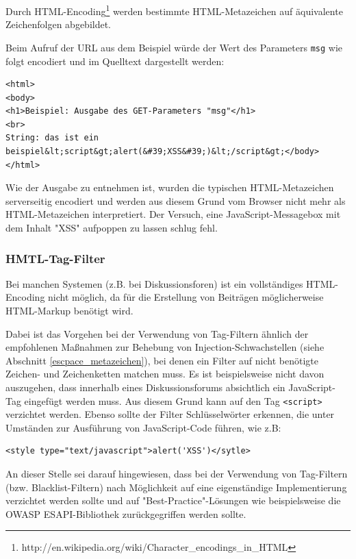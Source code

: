Durch HTML-Encoding\footnote{http://en.wikipedia.org/wiki/Character\_encodings\_in\_HTML} 
werden bestimmte HTML-Metazeichen auf äquivalente Zeichenfolgen abgebildet.

Beim Aufruf der URL aus dem Beispiel würde der Wert des Parameters 
\texttt{msg} wie folgt encodiert und im Quelltext dargestellt werden:

\begin{lstlisting}[basicstyle=\ttfamily\footnotesize]
<html>
<body>
<h1>Beispiel: Ausgabe des GET-Parameters "msg"</h1>
<br>
String: das ist ein beispiel&lt;script&gt;alert(&#39;XSS&#39;)&lt;/script&gt;</body>
</html>
\end{lstlisting}

Wie der Ausgabe zu entnehmen ist, wurden die typischen HTML-Metazeichen 
serverseitig encodiert und werden aus diesem Grund vom Browser nicht 
mehr als HTML-Metazeichen interpretiert. Der Versuch, eine JavaScript-Messagebox 
mit dem Inhalt "XSS" aufpoppen zu lassen schlug fehl.

\subsubsection{HMTL-Tag-Filter}

Bei manchen Systemen (z.B. bei Diskussionsforen) ist ein vollständiges 
HTML-Encoding nicht möglich, da für die Erstellung von Beiträgen 
möglicherweise HTML-Markup benötigt wird. 

Dabei ist das Vorgehen bei der Verwendung von Tag-Filtern ähnlich der 
empfohlenen Maßnahmen zur Behebung von Injection-Schwachstellen 
(siehe Abschnitt \ref{escpace_metazeichen}), bei denen ein Filter auf 
nicht benötigte Zeichen- und Zeichenketten matchen muss. Es ist 
beispielsweise nicht davon auszugehen, dass innerhalb eines 
Diskussionsforums absichtlich ein JavaScript-Tag eingefügt werden 
muss. Aus diesem Grund kann auf den Tag \texttt{<script>} verzichtet 
werden. Ebenso sollte der Filter Schlüsselwörter erkennen, die unter 
Umständen zur Ausführung von JavaScript-Code führen, wie z.B:

\begin{lstlisting}[basicstyle=\ttfamily\footnotesize]
<style type="text/javascript">alert('XSS')</sytle>
\end{lstlisting}

An dieser Stelle sei darauf hingewiesen, dass bei der Verwendung von 
Tag-Filtern (bzw. Blacklist-Filtern) nach Möglichkeit auf eine 
eigenständige Implementierung verzichtet werden sollte und auf 
"Best-Practice"-Lösungen wie beispielsweise die OWASP 
ESAPI-Bibliothek zurückgegriffen werden sollte.

